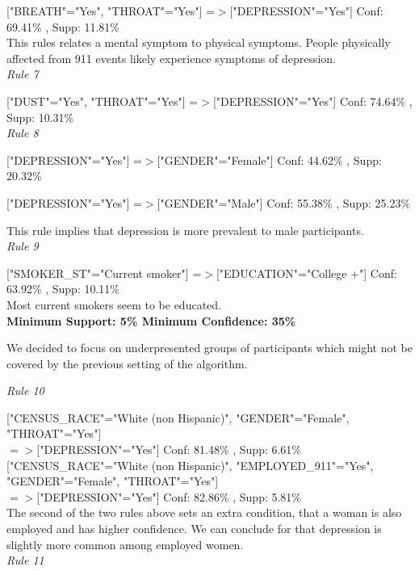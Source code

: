 \documentclass[11pt]{article}
\begin{document}
["BREATH"="Yes", "THROAT"="Yes"] =$>$["DEPRESSION"="Yes"] Conf: 69.41\% , Supp: 11.81\%  \\

This rules relates a mental symptom to physical symptoms. People physically affected from 911 events likely experience symptoms
of depression. \\

\textit{Rule 7}

["DUST"="Yes", "THROAT"="Yes"] =$>$["DEPRESSION"="Yes"] Conf: 74.64\% , Supp: 10.31\%  \\

\textit{Rule 8}

["DEPRESSION"="Yes"] =$>$["GENDER"="Female"] Conf: 44.62\% , Supp: 20.32\%  

["DEPRESSION"="Yes"] =$>$["GENDER"="Male"] Conf: 55.38\% , Supp: 25.23\% 

This rule implies that depression is more prevalent to male participants. \\

\textit{Rule 9}

["SMOKER\_ST"="Current smoker"] =$>$["EDUCATION"="College +"] Conf: 63.92\% , Supp: 10.11\%  \\

Most current smokers seem to be educated. \\

\textbf{Minimum Support: 5\% Minimum Confidence: 35\%}

We decided to focus on underpresented groups of participants which might not be covered by the previous setting of the algorithm.

\textit{Rule 10}

["CENSUS\_RACE"="White (non Hispanic)", "GENDER"="Female", "THROAT"="Yes"] \\
$=>$["DEPRESSION"="Yes"] Conf: 81.48\% , Supp: 6.61\%   \\

["CENSUS\_RACE"="White (non Hispanic)", "EMPLOYED\_911"="Yes", "GENDER"="Female", "THROAT"="Yes"]\\
 $=>$["DEPRESSION"="Yes"] Conf: 82.86\% , Supp: 5.81\%  \\

The second of the two rules above sets an extra condition, that a woman is also employed and has higher confidence. We can conclude for that depression
is slightly more common among employed women. \\

\textit{Rule 11}
\end{document}
